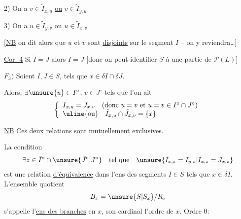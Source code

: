 2) On a $v\in\tilde I_{x,u}$ \uline{ou} $v\in\tilde I_{y,u}$

3) On a $u\in\tilde I_{y,v}$ ou $u\in\tilde I_{x,v}$


[\uline{NB} on dit alors que $u$ et $v$ sont  \uline{disjoints} sur le segment $I$ -- on y reviendra\ldots]

\uline{Cor. 4} Si $\tilde I=\tilde J$ alors $I=J$ [donc on peut identifier $S$ à une partie de $\mathcal P(L)$]

$F_3)$ Soient $I,J\in S$,  tels que $x\in\delta I\cap\delta J$.

Alors,  \deleted{$\unsure{\exists}$}
$\exists\unsure{u}\in I^\circ$, $v\in J^\circ$ tels que  l'on ait
\[
\left\{
\begin{array}{l}
I_{x,u}=J_{x,v}\quad(\text{donc }u=v\text{ et }u=v\in I^\circ\cap J^\circ)\\
\uline{\text{ou}}\quad \tilde I_{x,u}\cap\tilde J_{x,v}=\{x\}
\end{array}
\right.
\]

\uline{NB} Ces deux relations sont mutuellement exclusives.

La condition
\[
\exists z\in\tilde I^\circ\cap\unsure{\tilde J^\circ|J^\circ}
\quad\text{tel que}\quad
\unsure{I_{x,z}=I_{y,z}|I_{x,z}=J_{x,z}}
\]
est une relation \uline{d'équivalence}  dans l'ens  des segments $I\in S$ tels que $x\in\delta I$.
L'ensemble quotient
\[
B_x=\unsure{S|S_x}/R_x
\]
s'appelle l'\uline{ens des branches} en $x$, son cardinal l'ordre de $x$. Ordre 0:

